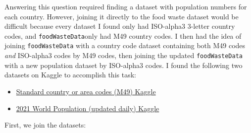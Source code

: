 \documentclass[
]{article}
\providecommand{\tightlist}{%
  \setlength{\itemsep}{0pt}\setlength{\parskip}{0pt}}
\begin{document}
Answering this question required finding a dataset with population
numbers for each country. However, joining it directly to the food waste
dataset would be difficult because every dataset I found only had
ISO-alpha3 3-letter country codes, and \texttt{foodWasteData}only had
M49 country codes. I then had the idea of joining \texttt{foodWasteData}
with a country code dataset containing both M49 codes \emph{and}
ISO-alpha3 codes by M49 codes, then joining the updated
\texttt{foodWasteData} with a new population dataset by ISO-alpha3
codes. I found the following two datasets on Kaggle to accomplish this
task:

\begin{itemize}
\tightlist
\item
  \href{https://www.kaggle.com/datasets/najielkotob/standard-country-or-area-codes-m49}{Standard
  country or area codes (M49) \textbar{} Kaggle}
\item
  \href{https://www.kaggle.com/datasets/rsrishav/world-population}{2021
  World Population (updated daily) \textbar{} Kaggle}
\end{itemize}

First, we join the datasets:
\end{document}
